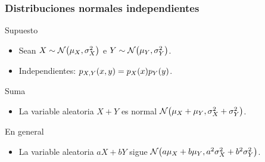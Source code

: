 \documentclass[table]{beamer}
\begin{document}
\iffalse
\begin{frame}
    \frametitle{Considerando producto interno $\lparens{X , Y} = \cov{X , Y}$}
    \begin{block}{Se tiene}
        \begin{itemize}
            \item $\vvparens{X} = \sqrt{\cov{X, X}} = \sqrt{\variance{X}}$.
            \item $\cos \parens{\theta} = \frac{\lparens{X, Y}}{\vvparens{X} \vvparens{Y}} = \frac{\cov{X, Y}}{\sqrt{\variance{X}} \sqrt{\variance{Y}}} = \corr{X, Y}$ .
            \item $\variance{X + Y} = \variance{X} + \variance{Y} + 2 \sqrt{\variance{X}} \sqrt{\variance{Y}} \cos \parens{\theta}$.
        \end{itemize}
    \end{block}
    \begin{center}
        \texttt{[image: pitagoras\_varianza]}
    \end{center}
\end{frame}
\fi



\begin{frame}
    \frametitle{Distribuciones normales independientes}
    \begin{block}{Supuesto}
        \begin{itemize}
            \item Sean $X \sim \normal{\mu_{X}}{\sigma^{2}_{X}}$
                e $Y \sim \normal{\mu_{Y}}{\sigma^{2}_{Y}}$.
            \item Independientes: $\ppdf{X , Y}{x , y} = \ppdf{X}{x} \ppdf{Y}{y}$.
        \end{itemize}
    \end{block}
    \begin{block}{Suma}
        \begin{itemize}
            \item La variable aleatoria $X + Y$ es normal $\normal{\mu_{X} + \mu_{Y}}{\sigma^{2}_{X} + \sigma^{2}_{Y}}$.
        \end{itemize}
    \end{block}
    \begin{block}{En general}
        \begin{itemize}
            \item La variable aleatoria $a X + b Y$ sigue $\normal{a \mu_{X} + b \mu_{Y}}{a^{2} \sigma^{2}_{X} + b^{2} \sigma^{2}_{Y}}$.
        \end{itemize}
    \end{block}
\end{frame}
\end{document}
